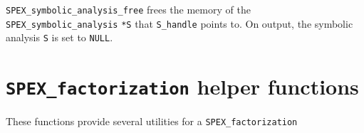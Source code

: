 \documentclass[12pt,oneside]{book}
\theoremstyle{definition}
\begin{document}
\verb|SPEX_symbolic_analysis_free| frees the memory of the \verb|SPEX_symbolic_analysis| \verb|*S| that \verb|S_handle| points to. On output, the symbolic analysis \verb|S| is set to \verb|NULL|.


\section{\texttt{SPEX\_factorization} helper functions} \label{s:spex_factorization_helper}
These functions provide several utilities for a \verb|SPEX_factorization|
\end{document}
